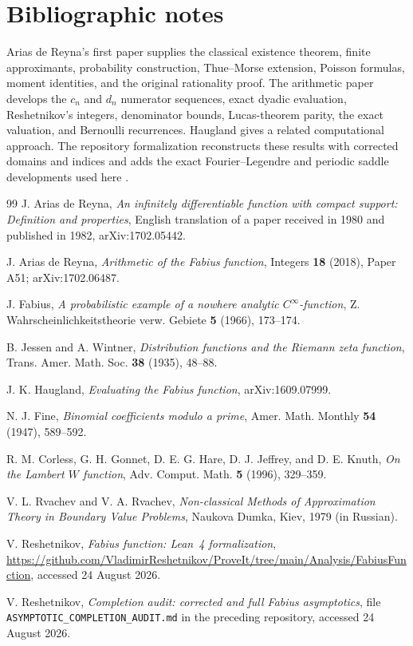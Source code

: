 \documentclass[11pt]{article}
\theoremstyle{definition}
\theoremstyle{remark}
\begin{document}
\section{Bibliographic notes}\label{app:bibnotes}
Arias de Reyna's first paper supplies the classical existence theorem, finite approximants, probability construction, Thue--Morse extension, Poisson formulas, moment identities, and the original rationality proof.  The arithmetic paper develops the $c_n$ and $d_n$ numerator sequences, exact dyadic evaluation, Reshetnikov's integers, denominator bounds, Lucas-theorem parity, the exact valuation, and Bernoulli recurrences.  Haugland gives a related computational approach.  The repository formalization reconstructs these results with corrected domains and indices and adds the exact Fourier--Legendre and periodic saddle developments used here \cite{Arias1982,AriasArithmetic,Haugland,ReshetnikovLean,ReshetnikovAudit}.

\begin{thebibliography}{99}
J. Arias de Reyna,
\emph{An infinitely differentiable function with compact support: Definition and properties},
English translation of a paper received in 1980 and published in 1982,
arXiv:1702.05442.

J. Arias de Reyna,
\emph{Arithmetic of the Fabius function},
Integers \textbf{18} (2018), Paper A51; arXiv:1702.06487.

J. Fabius,
\emph{A probabilistic example of a nowhere analytic $C^\infty$-function},
Z. Wahrscheinlichkeitstheorie verw. Gebiete \textbf{5} (1966), 173--174.

B. Jessen and A. Wintner,
\emph{Distribution functions and the Riemann zeta function},
Trans. Amer. Math. Soc. \textbf{38} (1935), 48--88.

J. K. Haugland,
\emph{Evaluating the Fabius function},
arXiv:1609.07999.

N. J. Fine,
\emph{Binomial coefficients modulo a prime},
Amer. Math. Monthly \textbf{54} (1947), 589--592.

R. M. Corless, G. H. Gonnet, D. E. G. Hare, D. J. Jeffrey, and D. E. Knuth,
\emph{On the Lambert $W$ function},
Adv. Comput. Math. \textbf{5} (1996), 329--359.

V. L. Rvachev and V. A. Rvachev,
\emph{Non-classical Methods of Approximation Theory in Boundary Value Problems},
Naukova Dumka, Kiev, 1979 (in Russian).

V. Reshetnikov,
\emph{Fabius function: Lean~4 formalization},
\url{https://github.com/VladimirReshetnikov/ProveIt/tree/main/Analysis/FabiusFunction},
accessed 24 August 2026.

V. Reshetnikov,
\emph{Completion audit: corrected and full Fabius asymptotics},
file \texttt{ASYMPTOTIC\_COMPLETION\_AUDIT.md} in the preceding repository,
accessed 24 August 2026.
\end{thebibliography}
\end{document}
